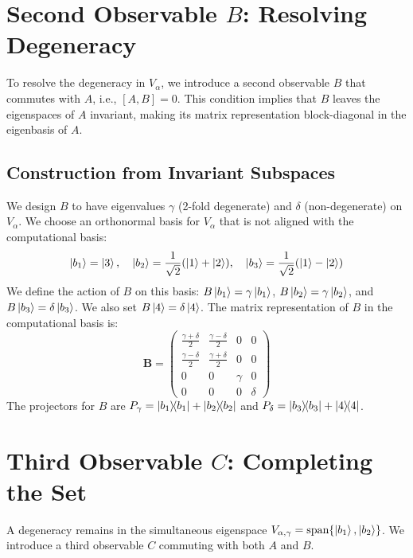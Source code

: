 \documentclass[11pt,a4paper]{article}
\begin{document}
\section{Second Observable \texorpdfstring{$B$}{B}: Resolving Degeneracy}

To resolve the degeneracy in $V_\alpha$, we introduce a second observable $B$
that commutes with $A$, i.e., $[A, B] = 0$. This condition implies that $B$
leaves the eigenspaces of $A$ invariant, making its matrix representation
block-diagonal in the eigenbasis of $A$.

\subsection{Construction from Invariant Subspaces}
We design $B$ to have eigenvalues $\gamma$ (2-fold degenerate) and $\delta$
(non-degenerate) on $V_\alpha$. We choose an orthonormal basis for $V_\alpha$
that is not aligned with the computational basis:
$$ \ket{b_1} = \ket{3}, \quad \ket{b_2} = \frac{1}{\sqrt{2}}(\ket{1}+\ket{2}),
\quad \ket{b_3} = \frac{1}{\sqrt{2}}(\ket{1}-\ket{2}) $$
We define the action of $B$ on this basis: $B\ket{b_1}=\gamma\ket{b_1}$,
$B\ket{b_2}=\gamma\ket{b_2}$, and $B\ket{b_3}=\delta\ket{b_3}$. We also set
$B\ket{4}=\delta\ket{4}$. The matrix representation of $B$ in the computational
basis is:
$$
\mathbf{B} = \begin{pmatrix}
  \frac{\gamma+\delta}{2} & \frac{\gamma-\delta}{2} & 0 & 0 \\
  \frac{\gamma-\delta}{2} & \frac{\gamma+\delta}{2} & 0 & 0 \\
  0 & 0 & \gamma & 0 \\
  0 & 0 & 0 & \delta
\end{pmatrix}
$$
The projectors for $B$ are $P_\gamma = \dyad{b_1}{b_1}+\dyad{b_2}{b_2}$ and
$P_\delta = \dyad{b_3}{b_3}+\dyad{4}{4}$.

\section{Third Observable \texorpdfstring{$C$}{C}: Completing the Set}
A degeneracy remains in the simultaneous eigenspace $V_{\alpha, \gamma} =
\text{span}\{\ket{b_1}, \ket{b_2}\}$. We introduce a third observable $C$
commuting with both $A$ and $B$.
\end{document}

